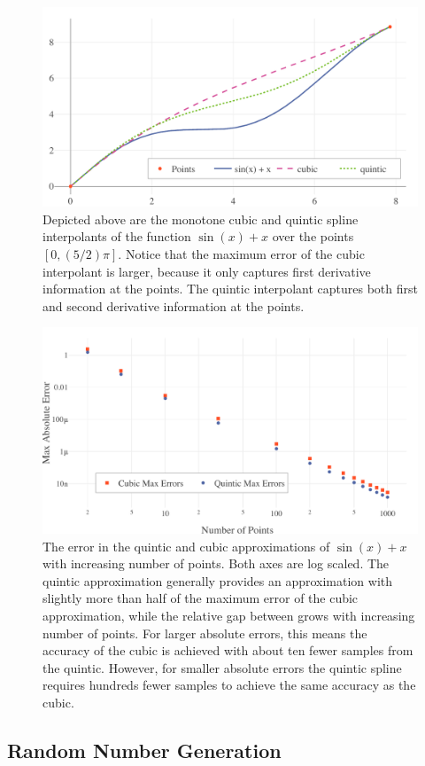 \documentclass{scspaperproc}
\theoremstyle{scsthe}
\begin{document}
\begin{figure}
  \centering
  \includegraphics[width=.7\textwidth]{cubic-quintic-sin}
  \caption{Depicted above are the monotone cubic and quintic spline interpolants of the function $\sin(x) + x$ over the points $[0, (5/2) \pi]$.  Notice that the maximum error of the cubic interpolant is larger, because it only captures first derivative information at the points. The quintic interpolant captures both first and second derivative information at the points.}
  \label{fig:cubic_quintic_sin}
\end{figure}

\begin{figure}
  \centering
  \includegraphics[width=.7\textwidth]{experiment_1_errors}
  \caption{The error in the quintic and cubic approximations of $\sin(x) + x$ with increasing number of points. Both axes are log scaled. The quintic approximation generally provides an approximation with slightly more than half of the maximum error of the cubic approximation, while the relative gap between grows with increasing number of points. For larger absolute errors, this means the accuracy of the cubic is achieved with about ten fewer samples from the quintic. However, for smaller absolute errors the quintic spline requires hundreds fewer samples to achieve the same accuracy as the cubic.}
  \label{fig:experiment_1}
\end{figure}


\subsection{Random Number Generation}
\end{document}
